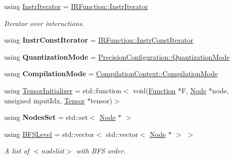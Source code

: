 \begin{DoxyCompactItemize}
using \hyperlink{namespaceglow_ab49ee75ee62d0543c929b88397878709}{Instr\+Iterator} = \hyperlink{classglow_1_1tagged__list__details_1_1_iterator}{I\+R\+Function\+::\+Instr\+Iterator}
\begin{DoxyCompactList}\small\item\em Iterator over inteructions. \end{DoxyCompactList}\item 
\mbox{\label{namespaceglow_a91cab7bdf4a5e1c4a1857b205e81b9b2}} 
using {\bfseries Instr\+Const\+Iterator} = \hyperlink{classglow_1_1tagged__list__details_1_1_iterator}{I\+R\+Function\+::\+Instr\+Const\+Iterator}
\item 
\mbox{\label{namespaceglow_a4b10fbca9c94f2c0d66386145e9b9d2b}} 
using {\bfseries Quantization\+Mode} = \hyperlink{structglow_1_1_precision_configuration_a9a40e5e2126e4c6f3e8fe3bab25ff12c}{Precision\+Configuration\+::\+Quantization\+Mode}
\item 
\mbox{\label{namespaceglow_ad80a5ab10dc4435c6c8ba69a4b279d4b}} 
using {\bfseries Compilation\+Mode} = \hyperlink{structglow_1_1_compilation_context_a92efb87746c0edf7756b84fdcd87014a}{Compilation\+Context\+::\+Compilation\+Mode}
\item 
using \hyperlink{namespaceglow_a32fc0e338408955f80a23cc7e0c0c82e}{Tensor\+Initializer} = std\+::function$<$ void(\hyperlink{classglow_1_1_function}{Function} $\ast$F, \hyperlink{classglow_1_1_node}{Node} $\ast$node, unsigned input\+Idx, \hyperlink{classglow_1_1_tensor}{Tensor} $\ast$tensor)$>$
\item 
\mbox{\label{namespaceglow_ad640073dcff44c25b1819e1cb420f701}} 
using {\bfseries Nodes\+Set} = std\+::set$<$ \hyperlink{classglow_1_1_node}{Node} $\ast$ $>$
\item 
\mbox{\label{namespaceglow_a03e8d2f34b0b5876fd4f7abaf0a0d73d}} 
using \hyperlink{namespaceglow_a03e8d2f34b0b5876fd4f7abaf0a0d73d}{B\+F\+S\+Level} = std\+::vector$<$ std\+::vector$<$ \hyperlink{classglow_1_1_node}{Node} $\ast$ $>$ $>$
\begin{DoxyCompactList}\small\item\em A list of $<$nodelist$>$ with B\+FS order. \end{DoxyCompactList}\item 

\end{DoxyCompactItemize}
